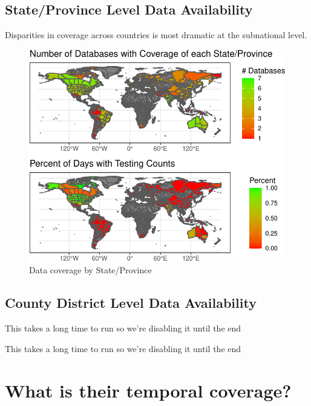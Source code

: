 \documentclass[
]{book}
\begin{document}
\hypertarget{stateprovince-level-data-availability}{%
\subsection{State/Province Level Data Availability}\label{stateprovince-level-data-availability}}

Disparities in coverage across countries is most dramatic at the subnational level.

\begin{figure}

{\centering \includegraphics[width=1\linewidth]{HowToBeCarefulWithCovid19Counts_files/figure-latex/nice-fig3-1} 

}

\caption{Data coverage by State/Province}\label{fig:nice-fig3}
\end{figure}

\hypertarget{county-district-level-data-availability}{%
\subsection{County District Level Data Availability}\label{county-district-level-data-availability}}

This takes a long time to run so we're disabling it until the end

This takes a long time to run so we're disabling it until the end

\hypertarget{what-is-their-temporal-coverage}{%
\section{What is their temporal coverage?}\label{what-is-their-temporal-coverage}}
\end{document}

